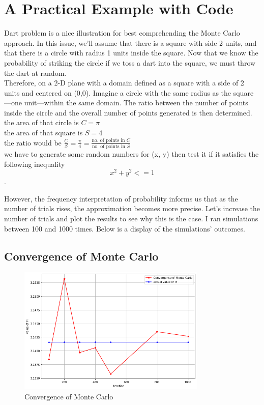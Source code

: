 

\section{A Practical Example with Code}
\noindent Dart problem is a nice illustration for best comprehending the Monte Carlo approach. In this issue, we'll assume that there is a square with side 2 units, and that there is a circle with radius 1 units inside the square. Now that we know the probability of striking the circle if we toss a dart into the square, we must throw the dart at random.\\[2mm]

Therefore, on a 2-D plane with a domain defined as a square with a side of 2 units and centered on (0,0). Imagine a circle with the same radius as the square—one unit—within the same domain. The ratio between the number of points inside the circle and the overall number of points generated is then determined. \\
the area of that circle is $C=\pi$ \\
the area of that square is $S=4$ \\
the ratio would be
$\frac{C}{S}=\frac{\pi}{4}=\frac{\text{no. of points in }C}{\text{no. of points in }S}$\\[2mm]

we have to generate some random numbers for (x, y) then test it if it satisfies the following inequality 
$$x^2+y^2<=1$$. 


However, the frequency interpretation of probability informs us that as the number of trials rises, the approximation becomes more precise. Let's increase the number of trials and plot the results to see why this is the case. I ran simulations between 100 and 1000 times. Below is a display of the simulations' outcomes.\\

\subsection{Convergence of Monte Carlo}
\begin{figure}[H]
	\begin{center}
		\includegraphics[width=0.8\textwidth]{dart_prob}
	\end{center}
	\caption{Convergence of Monte Carlo}
\end{figure}

